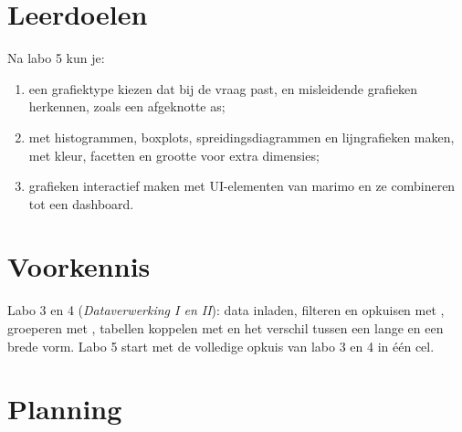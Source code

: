 \documentclass[11pt,a4paper]{article}
\begin{document}



\section{Leerdoelen}

Na labo 5 kun je:

\begin{enumerate}[label=\textbf{LD\arabic*}, leftmargin=1.4cm]
  \item een grafiektype kiezen dat bij de vraag past, en misleidende
        grafieken herkennen, zoals een afgeknotte as;
  \item met  histogrammen, boxplots,
        spreidingsdiagrammen en lijngrafieken maken, met kleur, facetten
        en grootte voor extra dimensies;
  \item grafieken interactief maken met UI-elementen van marimo en ze
        combineren tot een dashboard.
\end{enumerate}

\section{Voorkennis}

Labo 3 en 4 (\emph{Dataverwerking I en II}): data inladen, filteren en
opkuisen met , groeperen met , tabellen
koppelen met  en het verschil tussen een lange en een brede
vorm. Labo 5 start met de volledige opkuis van labo 3 en 4 in één cel.





\section{Planning}


\end{document}
